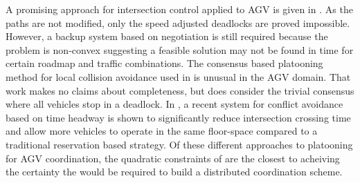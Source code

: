 A promising approach for intersection control applied to AGV is given in \cite{Digani2019}. As the paths are not modified, only the speed adjusted deadlocks are proved impossible. However, a backup system based on negotiation is still required because the problem is non-convex suggesting a feasible solution may not be found in time for certain roadmap and traffic combinations. The consensus based platooning method for local collision avoidance used in \cite{Tadano2019} is unusual in the AGV domain. That work makes no claims about completeness, but does consider the trivial consensus where all vehicles stop in a deadlock. In \cite{Zhang2018}, a recent system for conflict avoidance based on time headway is shown to significantly reduce intersection crossing time and allow more vehicles to operate in the same floor-space compared to a traditional reservation based strategy. Of these different approaches to platooning for AGV coordination, the quadratic constraints of \cite{Digani2019} are the closest to acheiving the certainty the would be required to build a distributed coordination scheme.
%


